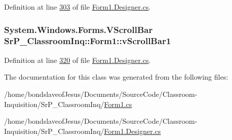 \-Definition at line \hyperlink{_form1_8_designer_8cs_source_l00303}{303} of file \hyperlink{_form1_8_designer_8cs_source}{\-Form1.\-Designer.\-cs}.

\hypertarget{class_sr_p___classroom_inq_1_1_form1_a782e2e05e0a099a77a85c00d4189c762}{
\subsubsection[{v\-Scroll\-Bar1}]{\setlength{\rightskip}{0pt plus 5cm}\-System.\-Windows.\-Forms.\-V\-Scroll\-Bar {\bf \-Sr\-P\-\_\-\-Classroom\-Inq\-::\-Form1\-::v\-Scroll\-Bar1}}}
\label{class_sr_p___classroom_inq_1_1_form1_a782e2e05e0a099a77a85c00d4189c762}


\-Definition at line \hyperlink{_form1_8_designer_8cs_source_l00320}{320} of file \hyperlink{_form1_8_designer_8cs_source}{\-Form1.\-Designer.\-cs}.



\-The documentation for this class was generated from the following files\-:\begin{DoxyCompactItemize}
\item 
/home/bondslaveof\-Jesus/\-Documents/\-Source\-Code/\-Classroom-\/\-Inquisition/\-Sr\-P\-\_\-\-Classroom\-Inq/\hyperlink{_form1_8cs}{\-Form1.\-cs}\item 
/home/bondslaveof\-Jesus/\-Documents/\-Source\-Code/\-Classroom-\/\-Inquisition/\-Sr\-P\-\_\-\-Classroom\-Inq/\hyperlink{_form1_8_designer_8cs}{\-Form1.\-Designer.\-cs}\end{DoxyCompactItemize}
